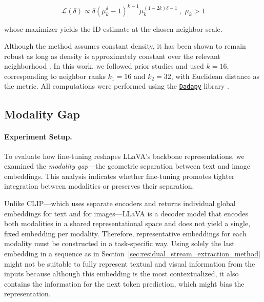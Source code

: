 \begin{equation*}
\mathcal{L}(\delta) \propto \delta (\mu_k^{\delta} - 1)^{k-1}  \mu_k^{(1-2k) \delta - 1} \; , \; \mu_k > 1
\label{eq:gride_likelihood}
\end{equation*}

whose maximizer yields the ID estimate at the chosen neighbor scale.

Although the method assumes constant density, it has been shown to remain robust as long as density is approximately constant over the relevant neighborhood \cite{dentiGeneralizedRatiosIntrinsic2022}. In this work, we followed prior studies \cite{doimoHierarchicalNucleationDeep2020, doimoRepresentationLandscapeFewShot, serraNarrowGateLocalizeda} and used $k = 16$, corresponding to neighbor ranks $k_1 = 16$ and $k_2 = 32$, with Euclidean distance as the metric. All computations were performed using the \href{https://dadapy.readthedocs.io/en/latest/}{\texttt{Dadapy}} library \cite{glielmoDADApyDistancebasedAnalysis2022}.

\subsection{Modality Gap}

\paragraph{Experiment Setup.} \label{sec:modality_gap_experiment_setup}

To evaluate how fine-tuning reshapes LLaVA's backbone representations, we examined the \emph{modality gap}---the geometric separation between text and image embeddings. This analysis indicates whether fine-tuning promotes tighter integration between modalities or preserves their separation.

Unlike CLIP---which uses separate encoders and returns individual global embeddings for text and for images---LLaVA is a decoder model that encodes both modalities in a shared representational space and does not yield a single, fixed embedding per modality. Therefore, representative embeddings for each modality must be constructed in a task-specific way. Using solely the last embedding in a sequence as in Section~\ref{sec:residual_stream_extraction_method} might not be suitable to fully represent textual and visual information from the inputs because although this embedding is the most contextualized, it also contains the information for the next token prediction, which might bias the representation. 

